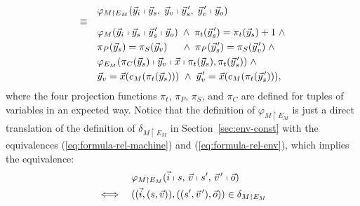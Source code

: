 \documentclass{sig-alternate}
\newcommand{\pvec}[1]{\vec{#1}\mkern2mu\vphantom{#1}} %
\begin{document}
\begin{align*}
&
\varphi_{M \restriction E_M}(\vec{y}_i\shortmid \vec{y}_s,\; \vec{y}_v\shortmid \pvec{y}_{\!s}',\; \pvec{y}_{\!v}'\shortmid \vec{y}_o)
\\
\ArrowBetweenLines[\equiv]
&
\varphi_M(\vec{y}_i\shortmid \vec{y}_s\shortmid \pvec{y}_{\!s}'\shortmid \vec{y}_o)
\;\wedge\;
\pi_t(\pvec{y}_{\!s}') = \pi_t(\vec{y}_s) + 1
\;\wedge
\\
&
\pi_P(\vec{y}_s) = \pi_S(\vec{y}_v) 
\,\;\quad\wedge\; \pi_P(\pvec{y}_{\!s}') = \pi_S(\pvec{y}_{\!v}')
\;\wedge
\\
&
\varphi_{E_M}( \pi_C(\vec{y}_s)\shortmid \vec{y}_v\shortmid \vec{x}\shortmid \pi_t(\vec{y}_{s}), \pi_t(\pvec{y}_{\!s}'))
\;\wedge
\\
&
\vec{y}_{v} = \vec{x}(c_M(\pi_t(\vec{y}_{s})))
\,\,\wedge\;
\pvec{y}_{\!v}' = \vec{x}(c_M(\pi_t(\pvec{y}_{\!s}'))),
\end{align*}
%
where the four projection functions  $\pi_t$,  $\pi_P$, $\pi_S$, and $\pi_C$
are defined for tuples of variables in an expected way.
Notice that the definition of $\varphi_{M \restriction E_M}$
is just a direct translation of the definition of $\delta_{M \restriction E_M}$
in Section~\ref{sec:env-const}
with the equivalences (\ref{eq:formula-rel-machine}) and (\ref{eq:formula-rel-env}),
which implies the equivalence:
\begin{equation}
\begin{aligned}
&
\varphi_{M \restriction E_M}(\vec{i}\shortmid s,\, \vec{v} \shortmid s',\, \pvec{v}' \shortmid \vec{o})
\\
\iff\quad&
( (\vec{i}, (s,\vec{v})), ((s',\pvec{v}'), \vec{o}) ) \in \delta_{M \restriction E_M}
\end{aligned}
\end{equation}
\end{document}
